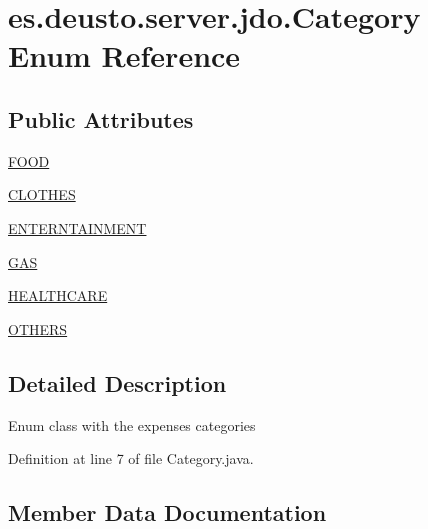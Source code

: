 \hypertarget{enumes_1_1deusto_1_1server_1_1jdo_1_1_category}{}\section{es.\+deusto.\+server.\+jdo.\+Category Enum Reference}
\label{enumes_1_1deusto_1_1server_1_1jdo_1_1_category}
\subsection*{Public Attributes}
\begin{DoxyCompactItemize}
\item 
\hyperlink{enumes_1_1deusto_1_1server_1_1jdo_1_1_category_aaeab5efd94749e3fbed17d4653090589}{F\+O\+OD}
\item 
\hyperlink{enumes_1_1deusto_1_1server_1_1jdo_1_1_category_aaa8d45c131dc385447328bf41d2cf906}{C\+L\+O\+T\+H\+ES}
\item 
\hyperlink{enumes_1_1deusto_1_1server_1_1jdo_1_1_category_ac2cf56f48a58629b75b917be8b3b8df6}{E\+N\+T\+E\+R\+N\+T\+A\+I\+N\+M\+E\+NT}
\item 
\hyperlink{enumes_1_1deusto_1_1server_1_1jdo_1_1_category_a8e8f689ee2c51a9b970eeb94d68e60bb}{G\+AS}
\item 
\hyperlink{enumes_1_1deusto_1_1server_1_1jdo_1_1_category_af004d7610b5df9d78bb287f732f0df1e}{H\+E\+A\+L\+T\+H\+C\+A\+RE}
\item 
\hyperlink{enumes_1_1deusto_1_1server_1_1jdo_1_1_category_a02964f033697863ad1fb73d197c7db9d}{O\+T\+H\+E\+RS}
\end{DoxyCompactItemize}


\subsection{Detailed Description}
Enum class with the expenses categories 

Definition at line 7 of file Category.\+java.



\subsection{Member Data Documentation}
\mbox{\label{enumes_1_1deusto_1_1server_1_1jdo_1_1_category_aaa8d45c131dc385447328bf41d2cf906}} 
